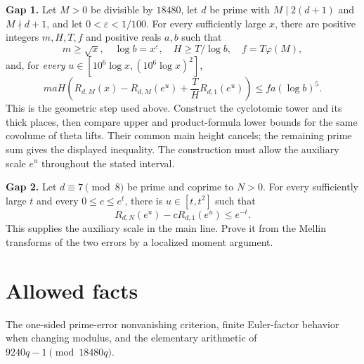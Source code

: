 \documentclass{article}
\begin{document}
\noindent\textbf{Gap 1.} Let \(M>0\) be divisible by \(18480\), let \(d\) be prime with \(M\mid2(d+1)\) and \(M\nmid d+1\), and let \(0<\varepsilon<1/100\). For every sufficiently large \(x\), there are positive integers \(m,H,T,f\) and positive reals \(a,b\) such that
\[
 m\ge\sqrt{x},\quad \log b=x^\varepsilon,\quad
 H\ge T/\log b,\quad f=T\varphi(M),
\]
and, for \emph{every} \(u\in[10^6\log x,(10^6\log x)^2]\),
\[
 maH\left(R_{d,M}(x)-R_{d,M}(e^u)
              +\frac TH R_{d,1}(e^u)\right)
 \le fa(\log b)^5.
\]
This is the geometric step used above. Construct the cyclotomic tower and its thick places, then compare upper and product-formula lower bounds for the same covolume of theta lifts. Their common main height cancels; the remaining prime sum gives the displayed inequality. The construction must allow the auxiliary scale \(e^u\) throughout the stated interval.

\medskip
\noindent\textbf{Gap 2.} Let \(d\equiv7\pmod8\) be prime and coprime to \(N>0\). For every sufficiently large \(t\) and every \(0\le c\le e^t\), there is \(u\in[t,t^2]\) such that
\[
 R_{d,N}(e^u)-cR_{d,1}(e^u)\le e^{-t}.
\]
This supplies the auxiliary scale in the main line. Prove it from the Mellin transforms of the two errors by a localized moment argument.

\section*{Allowed facts}
The one-sided prime-error nonvanishing criterion, finite Euler-factor behavior when changing modulus, and the elementary arithmetic of \(9240q-1\pmod{18480q}\).
\end{document}
